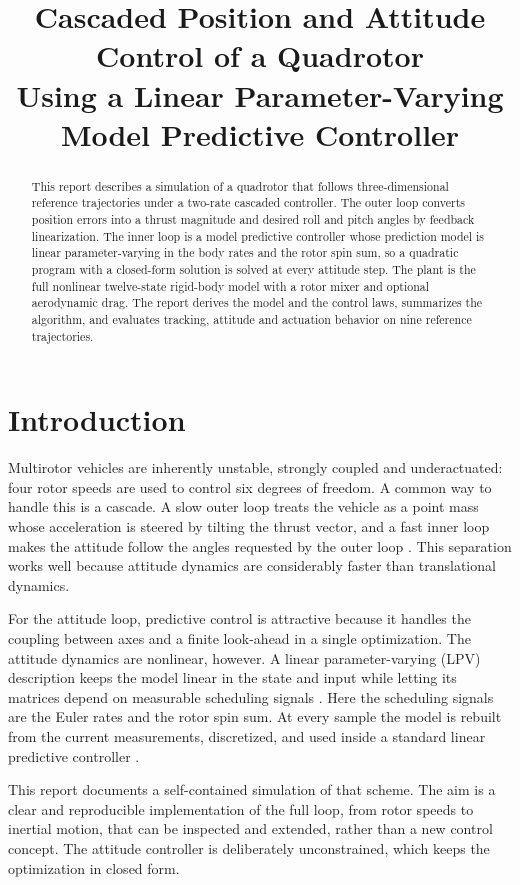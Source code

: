 \documentclass[11pt,a4paper]{article}
\title{Cascaded Position and Attitude Control of a Quadrotor\\
Using a Linear Parameter-Varying Model Predictive Controller}
\author{}
\date{}
\numberwithin{equation}{section}
\begin{document}
\maketitle

\begin{abstract}
This report describes a simulation of a quadrotor that follows three-dimensional reference trajectories under a two-rate cascaded controller. The outer loop converts position errors into a thrust magnitude and desired roll and pitch angles by feedback linearization. The inner loop is a model predictive controller whose prediction model is linear parameter-varying in the body rates and the rotor spin sum, so a quadratic program with a closed-form solution is solved at every attitude step. The plant is the full nonlinear twelve-state rigid-body model with a rotor mixer and optional aerodynamic drag. The report derives the model and the control laws, summarizes the algorithm, and evaluates tracking, attitude and actuation behavior on nine reference trajectories.
\end{abstract}

\section{Introduction}

Multirotor vehicles are inherently unstable, strongly coupled and underactuated: four rotor speeds are used to control six degrees of freedom. A common way to handle this is a cascade. A slow outer loop treats the vehicle as a point mass whose acceleration is steered by tilting the thrust vector, and a fast inner loop makes the attitude follow the angles requested by the outer loop \cite{mellinger2011}. This separation works well because attitude dynamics are considerably faster than translational dynamics.

For the attitude loop, predictive control is attractive because it handles the coupling between axes and a finite look-ahead in a single optimization. The attitude dynamics are nonlinear, however. A linear parameter-varying (LPV) description keeps the model linear in the state and input while letting its matrices depend on measurable scheduling signals \cite{shamma1990,briat2015}. Here the scheduling signals are the Euler rates and the rotor spin sum. At every sample the model is rebuilt from the current measurements, discretized, and used inside a standard linear predictive controller \cite{rawlings2017,wang2009}.

This report documents a self-contained simulation of that scheme. The aim is a clear and reproducible implementation of the full loop, from rotor speeds to inertial motion, that can be inspected and extended, rather than a new control concept. The attitude controller is deliberately unconstrained, which keeps the optimization in closed form.
\end{document}
